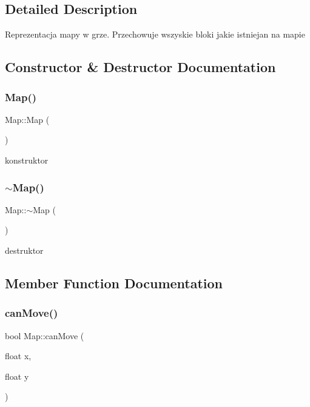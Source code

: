 \subsection{Detailed Description}
Reprezentacja mapy w grze. Przechowuje wszyskie bloki jakie istniejan na mapie 

\subsection{Constructor \& Destructor Documentation}
\mbox{\label{class_map_a0f5ad0fd4563497b4214038cbca8b582}} 
\subsubsection{\texorpdfstring{Map()}{Map()}}
{\footnotesize\ttfamily Map\+::\+Map (\begin{DoxyParamCaption}{ }\end{DoxyParamCaption})}

konstruktor \mbox{\label{class_map_aa403fbe09394ccf39747588f5168e3b2}} 
\subsubsection{\texorpdfstring{$\sim$\+Map()}{~Map()}}
{\footnotesize\ttfamily Map\+::$\sim$\+Map (\begin{DoxyParamCaption}{ }\end{DoxyParamCaption})}

destruktor 

\subsection{Member Function Documentation}
\mbox{\label{class_map_a9e0db2b7f0c2cc2083da543050f0fa91}} 
\subsubsection{\texorpdfstring{can\+Move()}{canMove()}}
{\footnotesize\ttfamily bool Map\+::can\+Move (\begin{DoxyParamCaption}\item[{float}]{x,  }\item[{float}]{y }\end{DoxyParamCaption})}

